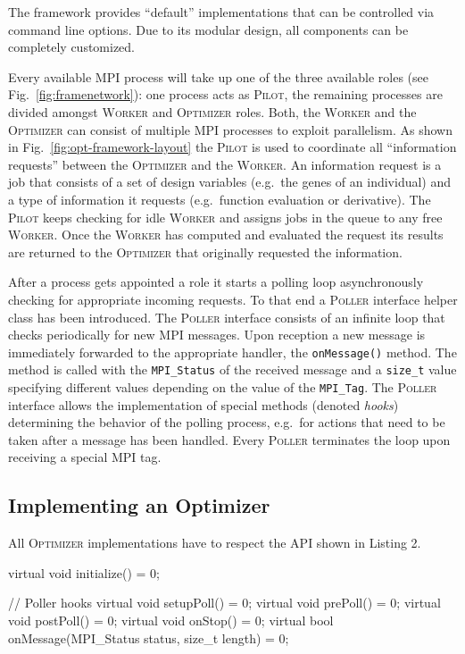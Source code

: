 \documentclass[%
reprint,
amsmath,amssymb,
aps,
prstab,
]{revtex4-1}
\begin{document}
The framework provides ``default'' implementations that can be controlled via
  command line options.
Due to its modular design, all components can be completely customized.

Every available MPI process will take up one of the three available roles (see
  Fig.~\ref{fig:framenetwork}):  one process acts as \textsc{Pilot}, the
  remaining processes are divided amongst \textsc{Worker} and
  \textsc{Optimizer} roles.
Both, the \textsc{Worker} and the \textsc{Optimizer} can consist of multiple
  MPI processes to exploit parallelism.
As shown in Fig.~\ref{fig:opt-framework-layout} the \textsc{Pilot} is used
  to coordinate all ``information requests'' between the \textsc{Optimizer}
  and the \textsc{Worker}.
An information request is a job that consists of a set of design variables
  (e.g.~the genes of an individual) and a type of information it requests
  (e.g.~function evaluation or derivative).
The \textsc{Pilot} keeps checking for idle \textsc{Worker} and assigns jobs
  in the queue to any free \textsc{Worker}.
Once the \textsc{Worker} has computed and evaluated the request its results
  are returned to the \textsc{Optimizer} that originally requested the
  information.

After a process gets appointed a role it starts a polling loop asynchronously
  checking for appropriate incoming requests.
To that end a \textsc{Poller} interface helper class has been introduced.
The \textsc{Poller} interface consists of an infinite loop that checks
  periodically for new MPI messages.
Upon reception a new message is immediately forwarded to the appropriate
  handler, the \texttt{onMessage()} method.
The method is called with the \texttt{MPI\_Status} of the received message and
  a \texttt{size\_t} value specifying different values depending on the value
  of the \texttt{MPI\_Tag}.
The \textsc{Poller} interface allows the implementation of special methods
  (denoted \textit{hooks}) determining the behavior of the polling process,
  e.g.\ for actions that need to be taken after a message has been handled.
Every \textsc{Poller} terminates the loop upon receiving a special MPI tag.


\subsection{Implementing an Optimizer}

All \textsc{Optimizer} implementations have to respect the API shown in
Listing 2.

\begin{code}
virtual void initialize() = 0;

// Poller hooks
virtual void setupPoll() = 0;
virtual void prePoll() = 0;
virtual void postPoll() = 0;
virtual void onStop() = 0;
virtual bool onMessage(MPI_Status status,
                       size_t length) = 0;
\end{code}
\end{document}
